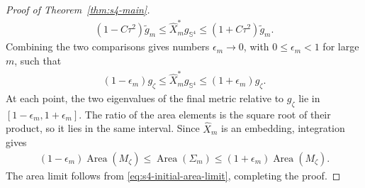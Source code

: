 \documentclass[a4paper,11pt,oneside,reqno]{amsart}
\numberwithin{equation}{section}
\theoremstyle{definition}
\let\textcedilla\c
\renewcommand{\c}{\mathbb{C}}
\begin{document}
\begin{proof}[Proof of Theorem~\ref{thm:s4-main}]
\begin{align*}
        (1-C\tau^2)\widetilde g_m
        \leq\widehat X_m^*g_{\mathbb S^4}
        \leq(1+C\tau^2)\widetilde g_m.
    \end{align*}
    Combining the two comparisons gives numbers
    $\epsilon_m\to0$, with $0\leq\epsilon_m<1$ for
    large $m$, such that
    \begin{align*}
        (1-\epsilon_m)g_\zeta
        \leq\widehat X_m^*g_{\mathbb S^4}
        \leq(1+\epsilon_m)g_\zeta.
    \end{align*}
    At each point, the two eigenvalues of the final metric
    relative to $g_\zeta$ lie in
    $[1-\epsilon_m,1+\epsilon_m]$. The ratio of the area
    elements is the square root of their product, so it
    lies in the same interval. Since $\widehat X_m$ is an
    embedding, integration gives
    \begin{align*}
        (1-\epsilon_m)\operatorname{Area}(M_\zeta)
        \leq\operatorname{Area}(\Sigma_m)
        \leq(1+\epsilon_m)\operatorname{Area}(M_\zeta).
    \end{align*}
    The area limit follows from
    \eqref{eq:s4-initial-area-limit}, completing the proof.
\end{proof}

\let\c\textcedilla


\end{document}
